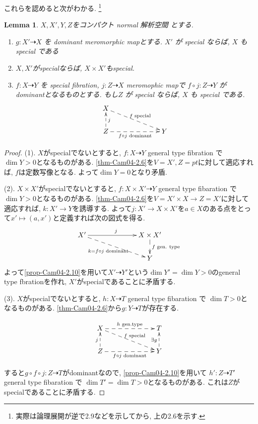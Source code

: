 \documentclass[dvipdfmx,a4paper,11pt]{article} %
\newtheorem{lem}[thm]{Lemma}
\theoremstyle{definition}
\theoremstyle{remark}
\numberwithin{equation}{section}
\begin{document}
これらを認めると次がわかる. \footnote{実際は論理展開が逆で2.9などを示してから, 上の2.6を示す. }
\begin{lem}\cite[Lemma 2.9, 2.17]{Cam04}
$X, X', Y, Z$をコンパクト normal 解析空間 とする. 
\label{lem-Cam04-2.9}
\begin{enumerate}
\item \(g : X' \dashrightarrow X\) を dominant meromorphic mapとする.
\(X'\) が special ならば, \(X\) も special である
\item $X, X'$がspecialならば, $X \times X'$もspecial.
\item \(f : X \dashrightarrow Y\) を special fibration, \(j : Z \dashrightarrow X\) meromophic mapで \(f\circ j : Z \dashrightarrow Y\) がdominantとなるものとする. 
もし\(Z\) が special ならば, \(X\) も special である.
\[
\xymatrix@C=70pt@R=20pt{
X  \ar@{-->}[dr]^{f \text{ special}} & \\
Z  \ar@{-->}[r]_{ f \circ j\text{ dominant}} \ar@{-->}[u]_{j}& Y
}
\]
\end{enumerate}
\end{lem}
\begin{proof}
(1). $X$がspecialでないとすると, $f : X \dashrightarrow Y$ general type fibration
で$\dim Y>0$となるものがある.  
\ref{thm-Cam04-2.6}を$V=X', Z=pt$に対して適応すれば, $f$は定数写像となる. 
よって$\dim Y=0$となり矛盾. 

(2). $X \times X'$がspecialでないとすると, $f : X \times X'\dashrightarrow Y$ general type fibaration 
で $\dim Y>0$となるものがある.  
\ref{thm-Cam04-2.6}を$V=X'\times X \to Z=X'$に対して適応すれば, $k : X' \to Y$を誘導する. 
よって$j : X' \to X \times X'$を$a \in X$のある点をとって$x' \mapsto (a, x')$と定義すれば次の図式を得る. 
\[
\xymatrix@C=70pt@R=20pt{
X'  \ar@{-->}[rd]_{ k= f \circ j \text{ dominant}}  \ar@{->}[r]^{j} & X \times X'  \ar@{-->}[d]^{ f \text{ gen. type}}  \\
& Y
}
\]
よって\ref{prop-Cam04-2.10}を用いて$X' \dashrightarrow Y'$という$\dim Y'=\dim Y >0$のgeneral type fbrationを作れ, $X'$がspecialであることに矛盾する. 



(3). $X$がspecialでないとすると, $h : X \dashrightarrow T$ general type fibaration で $\dim T>0$となるものがある.  
\ref{thm-Cam04-2.6}から$g : Y \dashrightarrow T$が存在する. 

\[
\xymatrix@C=70pt@R=20pt{
X  \ar@{-->}[dr]^{f \text{ special}} \ar@{-->}[r]^{h \text{ gen.type} } & T \\
Z  \ar@{-->}[r]_{ f \circ j\text{ dominant}} \ar@{-->}[u]^{j}& Y \ar@{-->}[u]^{ \exists g  }
}
\]

すると$g \circ  f \circ j : Z \dashrightarrow T$がdominantなので, \ref{prop-Cam04-2.10}を用いて
$h' : Z \dashrightarrow T'$ general type fibaration で $\dim T'=\dim T>0$となるものがある.  これは$Z$がspecialであることに矛盾する. 
\end{proof}
\end{document}
